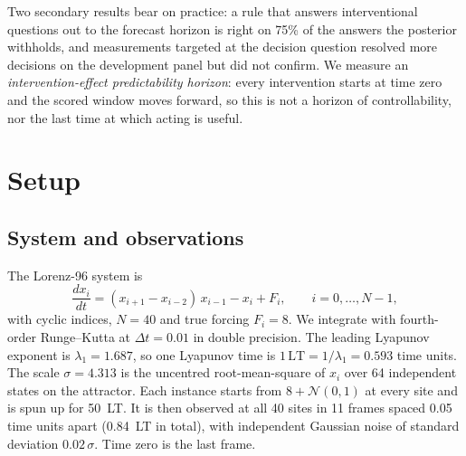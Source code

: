 \documentclass[11pt]{article}
\newcommand{\LT}{\mathrm{LT}}
\begin{document}
Two secondary results bear on practice: a rule that answers interventional questions out to the forecast horizon is right on 75\% of the answers the posterior withholds, and measurements targeted at the decision question resolved more decisions on the development panel but did not confirm. We measure an \emph{intervention-effect predictability horizon}: every intervention starts at time zero and the scored window moves forward, so this is not a horizon of controllability, nor the last time at which acting is useful.

\section{Setup}
\label{sec:setup}

\subsection{System and observations}
The Lorenz-96 system is
\begin{equation}
\frac{dx_i}{dt} = (x_{i+1} - x_{i-2})\,x_{i-1} - x_i + F_i, \qquad i = 0,\dots,N-1,
\label{eq:l96}
\end{equation}
with cyclic indices, $N = 40$ and true forcing $F_i = 8$. We integrate with fourth-order Runge--Kutta at $\Delta t = 0.01$ in double precision. The leading Lyapunov exponent is $\lambda_1 = 1.687$, so one Lyapunov time is $1\,\LT = 1/\lambda_1 = 0.593$ time units. The scale $\sigma = 4.313$ is the uncentred root-mean-square of $x_i$ over 64 independent states on the attractor. Each instance starts from $8 + \mathcal N(0,1)$ at every site and is spun up for 50~LT. It is then observed at all 40 sites in 11 frames spaced 0.05 time units apart (0.84~LT in total), with independent Gaussian noise of standard deviation $0.02\,\sigma$. Time zero is the last frame.
\end{document}
